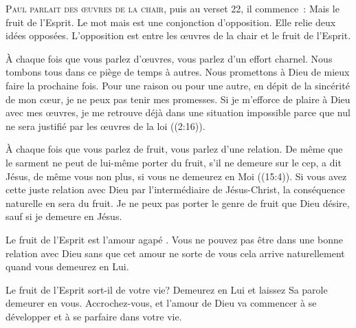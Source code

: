 





\lettrine{P}{aul parlait des œuvres de la chair,}
 puis au verset 22, il commence~: 
 \og Mais le fruit de l'Esprit. \fg{}
 Le mot \og mais \fg{} est une conjonction d'opposition.
 Elle relie deux idées opposées.
 L'opposition est entre les œuvres de la chair et le fruit de l'Esprit.

À chaque fois que vous parlez d'œuvres, vous parlez d'un effort charnel.
 Nous tombons tous dans ce piège de temps à autres. Nous promettons à Dieu
 de mieux faire la prochaine fois. Pour une raison ou pour une autre,
 en dépit de la sincérité de mon cœur, je ne peux pas tenir mes promesses.
 Si je m'efforce de plaire à Dieu avec mes œuvres, je me retrouve déjà
 dans une situation impossible parce que 
 \og nul ne sera justifié par les œuvres de la loi \fg{}
 ((2:16)). 



À chaque fois que vous parlez de fruit, vous parlez d'une relation.
 \og De même que le sarment ne peut de lui-même porter du fruit,
 s'il ne demeure sur le cep, a dit Jésus, 
 de même vous non plus, si vous ne demeurez en Moi \fg{}
 ((15:4)).
 Si vous avez cette juste relation avec Dieu par l'intermédiaire de Jésus-Christ,
 la conséquence naturelle en sera du fruit. Je ne peux pas porter
 le genre de fruit que Dieu désire, sauf si je demeure en Jésus.

Le fruit de l'Esprit est l'amour \og agapé \fg{}. Vous ne pouvez pas être
 dans une bonne relation avec Dieu sans que cet amour ne sorte de vous
 \ocadr cela arrive naturellement quand vous demeurez en Lui.

Le fruit de l'Esprit sort-il de votre vie? Demeurez en Lui et laissez Sa parole
 demeurer en vous. Accrochez-vous, et l'amour de Dieu va commencer
 à se développer et à se parfaire dans votre vie.

